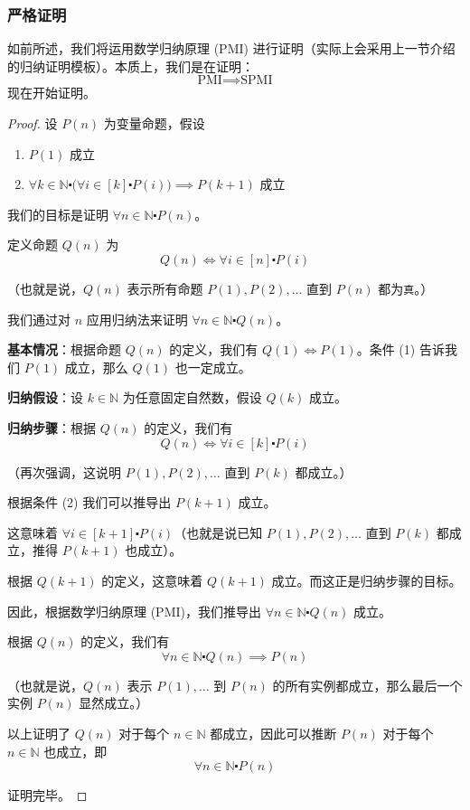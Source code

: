 \subsubsection*{严格证明}

如前所述，我们将运用数学归纳原理 (PMI) 进行证明（实际上会采用上一节介绍的归纳证明模板）。本质上，我们是在证明：
\[\text{PMI} \implies \text{SPMI}\]
现在开始证明。

\begin{proof}
    设 $P(n)$ 为变量命题，假设
    \begin{enumerate}[label=(\arabic*)]
        \item $P(1)$ 成立
        \item $\forall k \in \mathbb{N} \centerdot \big(\forall i \in [k] \centerdot P(i)\big) \implies P(k+1)$ 成立
    \end{enumerate}
    我们的目标是证明 $\forall n \in \mathbb{N} \centerdot P(n)$。

    定义命题 $Q(n)$ 为
    \[Q(n) \iff \forall i \in [n] \centerdot P(i)\]

    （也就是说，$Q(n)$ 表示所有命题 $P(1), P(2), \dots$ 直到 $P(n)$ 都为\verb|真|。）

    我们通过对 $n$ 应用归纳法来证明 $\forall n \in \mathbb{N} \centerdot Q(n)$。

    \textbf{基本情况}：根据命题 $Q(n)$ 的定义，我们有 $Q(1) \iff P(1)$。条件 (1) 告诉我们 $P(1)$ 成立，那么 $Q(1)$ 也一定成立。

    \textbf{归纳假设}：设 $k \in \mathbb{N}$ 为任意固定自然数，假设 $Q(k)$ 成立。

    \textbf{归纳步骤}：根据 $Q(n)$ 的定义，我们有
    \[Q(n) \iff \forall i \in [k] \centerdot P(i)\]

    （再次强调，这说明 $P(1), P(2), \dots$ 直到 $P(k)$ 都成立。）

    根据条件 (2) 我们可以推导出 $P(k+1)$ 成立。

    这意味着 $\forall i \in [k+1] \centerdot P(i)$（也就是说已知 $P(1), P(2), \dots$ 直到 $P(k)$ 都成立，推得 $P(k+1)$ 也成立）。

    根据 $Q(k+1)$ 的定义，这意味着 $Q(k+1)$ 成立。而这正是归纳步骤的目标。

    因此，根据数学归纳原理 (PMI)，我们推导出 $\forall n \in \mathbb{N} \centerdot Q(n)$ 成立。

    根据 $Q(n)$ 的定义，我们有
    \[\forall n \in \mathbb{N} \centerdot Q(n) \implies P(n)\]

    （也就是说，$Q(n)$ 表示 $P(1), \dots$ 到 $P(n)$ 的所有实例都成立，那么最后一个实例 $P(n)$ 显然成立。）

    以上证明了 $Q(n)$ 对于每个 $n \in \mathbb{N}$ 都成立，因此可以推断 $P(n)$ 对于每个 $n \in \mathbb{N}$ 也成立，即
    \[\forall n \in \mathbb{N} \centerdot P(n)\]

    证明完毕。
\end{proof}


